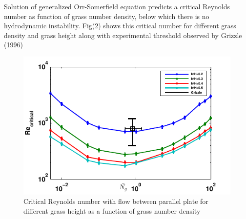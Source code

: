 \documentclass[aps,twocolumn,floatfix,prl,10pt]{revtex4-1}
\begin{document}
Solution of generalized Orr-Somerfield equation predicts a critical Reynolds number as function of grass number density, below which there is no hydrodynamic instability. Fig(2) shows 
this critical number for different grass density and grass height along with experimental threshold observed by Grizzle (1996)
  \begin{figure}[htb!]
  \includegraphics[]{Critical_Re_vs_Ng_Grizzle}
\caption{Critical Reynolds number with flow between parallel plate for different grass height as a function of grass number density}
\end{figure}
\end{document}
